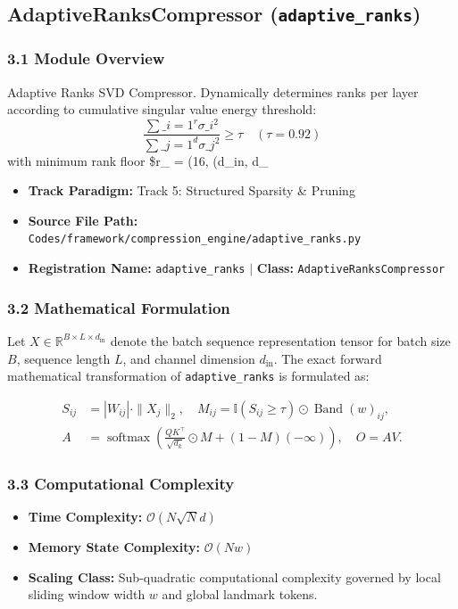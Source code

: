 \subsection{AdaptiveRanksCompressor (\texttt{adaptive\_ranks})}
\label{sec:app_module_adaptive_ranks}

\subsubsection*{3.1 Module Overview}
Adaptive Ranks SVD Compressor.  Dynamically determines ranks per layer according to cumulative singular value energy threshold:     $$\frac{\sum\_{i=1}^r \sigma\_i^2}{\sum\_{j=1}^d \sigma\_j^2} \ge \tau \quad (\tau = 0.92)$$ with minimum rank floor \$r\_{\min} = \max(16,  \cdot \min(d\_{in}, d\_
\begin{itemize}
    \item \textbf{Track Paradigm:} Track 5: Structured Sparsity & Pruning
    \item \textbf{Source File Path:} \texttt{Codes/framework/compression\_engine/adaptive\_ranks.py}
    \item \textbf{Registration Name:} \texttt{adaptive\_ranks} $\mid$ \textbf{Class:} \texttt{AdaptiveRanksCompressor}
\end{itemize}

\subsubsection*{3.2 Mathematical Formulation}
Let $X \in \mathbb{R}^{B \times L \times d_{\text{in}}}$ denote the batch sequence representation tensor for batch size $B$, sequence length $L$, and channel dimension $d_{\text{in}}$. The exact forward mathematical transformation of \texttt{adaptive\_ranks} is formulated as:

\begin{align}
S_{ij} &= |W_{ij}| \cdot \|X_j\|_2, \quad M_{ij} = \mathbb{I}(S_{ij} \ge \tau) \odot \operatorname{Band}(w)_{ij}, \\
A &= \operatorname{softmax}\left(\frac{Q K^\top}{\sqrt{d_k}} \odot M + (1 - M)(-\infty)\right), \quad O = A V.
\end{align}


\subsubsection*{3.3 Computational Complexity}
\begin{itemize}
    \item \textbf{Time Complexity:} $\mathcal{O}(N \sqrt{N} d)$
    \item \textbf{Memory State Complexity:} $\mathcal{O}(N w)$
    \item \textbf{Scaling Class:} Sub-quadratic computational complexity governed by local sliding window width $w$ and global landmark tokens.
\end{itemize}

